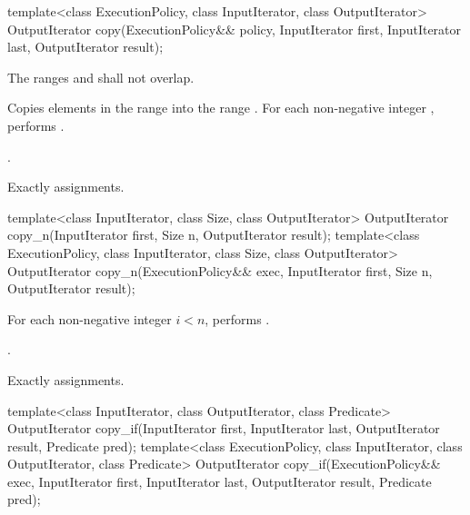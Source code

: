 %
\begin{itemdecl}
template<class ExecutionPolicy, class InputIterator, class OutputIterator>
  OutputIterator copy(ExecutionPolicy&& policy, InputIterator first, InputIterator last,
                      OutputIterator result);
\end{itemdecl}

\begin{itemdescr}
\pnum
\requires The ranges  and
 shall not overlap.

\pnum
\effects Copies elements in the range  into
the range .
For each non-negative integer ,
performs .

\pnum
\returns {}.

\pnum
\complexity Exactly  assignments.
\end{itemdescr}

%
\begin{itemdecl}
template<class InputIterator, class Size, class OutputIterator>
  OutputIterator copy_n(InputIterator first, Size n,
                        OutputIterator result);
template<class ExecutionPolicy, class InputIterator, class Size, class OutputIterator>
  OutputIterator copy_n(ExecutionPolicy&& exec,
                        InputIterator first, Size n,
                        OutputIterator result);
\end{itemdecl}


\begin{itemdescr}
\pnum
\effects For each non-negative integer 
$i < n$, performs .

\pnum
\returns {}.

\pnum
\complexity Exactly  assignments.
\end{itemdescr}

%
\begin{itemdecl}
template<class InputIterator, class OutputIterator, class Predicate>
  OutputIterator copy_if(InputIterator first, InputIterator last,
                         OutputIterator result, Predicate pred);
template<class ExecutionPolicy, class InputIterator, class OutputIterator, class Predicate>
  OutputIterator copy_if(ExecutionPolicy&& exec,
                         InputIterator first, InputIterator last,
                         OutputIterator result, Predicate pred);
\end{itemdecl}


